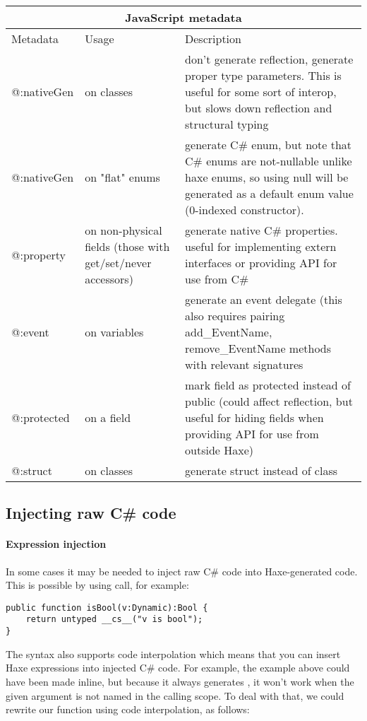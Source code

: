 \begin{center}
\begin{tabular}{| l | l | l |}
	\hline
	\multicolumn{3}{|c|}{JavaScript metadata} \\ \hline
	Metadata & Usage & Description \\ \hline
	@:nativeGen  &  on classes & don't generate reflection, generate proper type parameters. This is useful for some sort of interop, but slows down reflection and structural typing \\
	@:nativeGen  &  on "flat" enums & generate C# enum, but note that C# enums are not-nullable unlike haxe enums, so using null will be generated as a default enum value (0-indexed constructor). \\
	@:property  &  on non-physical fields (those with get/set/never accessors) & generate native C# properties. useful for implementing extern interfaces or providing API for use from C# \\
	@:event  &  on variables & generate an event delegate (this also requires pairing add_EventName, remove_EventName methods with relevant signatures \\
	@:protected  &  on a field & mark field as protected instead of public (could affect reflection, but useful for hiding fields when providing API for use from outside Haxe) \\
	@:struct  &  on classes  &  generate struct instead of class \\
\end{tabular}
\end{center}

\subsection{Injecting raw C# code}
\label{target-cs-code-injection}

\paragraph{Expression injection}

In some cases it may be needed to inject raw C# code into Haxe-generated code. This is possible by using   call, for example:

\begin{lstlisting}
public function isBool(v:Dynamic):Bool {
    return untyped __cs__("v is bool");
}
\end{lstlisting}
The   syntax also supports code interpolation which means that you can insert Haxe expressions into injected C# code. For example, the example above could have been made inline, but because it always generates  , it won't work when the given argument is not named   in the calling scope. To deal with that, we could rewrite our function using code interpolation, as follows:

